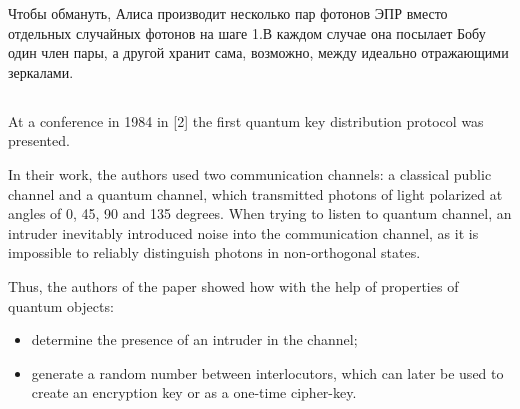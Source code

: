­­­Чтобы обмануть, Алиса производит несколько пар фотонов ЭПР вместо отдельных случайных фотонов на шаге 1.В каждом случае она посылает Бобу один член пары, а другой хранит сама, возможно, между идеально отражающими зеркалами.

\subsection{\review}

At a conference in 1984 in [2] the first quantum key distribution protocol was presented.

In their work, the authors used two communication channels: a classical public channel and a quantum channel, which transmitted photons of light polarized at angles of 0, 45, 90 and 135 degrees. When trying to listen to quantum channel, an intruder inevitably introduced noise into the communication channel, as it is impossible to reliably distinguish photons in non-orthogonal states.

Thus, the authors of the paper showed how with the help of properties of quantum objects:
\begin{itemize}
	\item determine the presence of an intruder in the channel;
	\item generate a random number between interlocutors, which can later be used to create an encryption key or as a one-time cipher-key.
\end{itemize}


\subsection{\dic}

